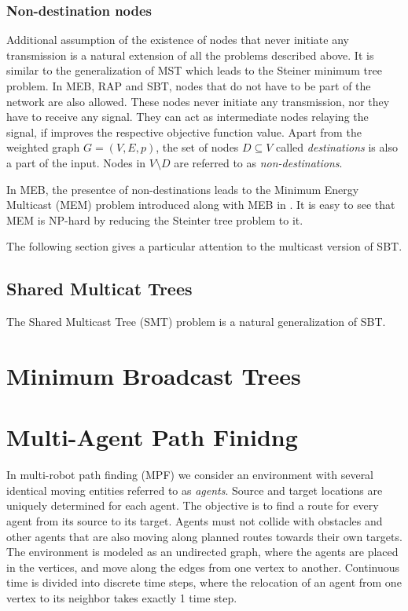 \subsubsection{Non-destination nodes}

Additional assumption of the existence of nodes that never initiate any transmission is a natural extension of all the problems described above.
It is similar to the generalization of MST which leads to the Steiner minimum tree problem.
In MEB, RAP and SBT, nodes that do not have to be part of the network are also allowed. 
These nodes never initiate any transmission, nor they have to receive any signal.
They can act as intermediate nodes relaying the signal, if improves the respective objective function value.
Apart from the weighted graph $G=(V,E,p)$, the set of nodes $D\subseteq V$ called \emph{destinations} is also a part of the input.
Nodes in $V\setminus D$ are referred to as \emph{non-destinations}.

In MEB, the presentce of non-destinations leads to the Minimum Energy Multicast (MEM) problem introduced along with MEB in \cite{wieselthier00}.
It is easy to see that MEM is NP-hard by reducing the Steinter tree problem to it.



The following section gives a particular attention to the multicast version of SBT.

\subsection{Shared Multicat Trees}

The Shared Multicast Tree (SMT) problem is a natural generalization of SBT.


\section{Minimum Broadcast Trees}\label{sec:mbt}

\section{Multi-Agent Path Finidng}\label{sec:app}

In multi-robot path finding (MPF) we consider an environment with several identical moving entities referred to as 
\emph{agents}. Source and target locations are uniquely determined for each agent. The objective
is to find a route for every agent from its source to its target.
Agents must not collide with obstacles and other agents that are also moving along
planned routes towards their own targets.
The environment is modeled as an undirected graph, where the agents are placed in the vertices, and move along the edges from one vertex to another. 
Continuous time is divided into discrete time steps, where the relocation of an agent from one vertex to its neighbor takes exactly 1 time step.

